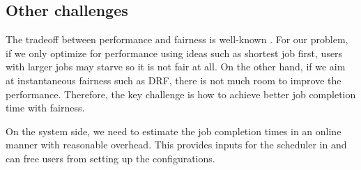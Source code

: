 




\subsection{Other challenges}




The tradeoff between performance and fairness is well-known \cite{fairness_efficency_tradeoffs,hug}.
For our problem, if we only optimize for performance using ideas such as shortest job first, users with larger jobs may starve so it is not fair at all.
On the other hand, if we aim at instantaneous fairness such as DRF, there is not much room to improve the performance.
Therefore, the key challenge is how to achieve better job completion time with fairness. 


On the system side, we need to estimate the job completion times in an online manner with reasonable overhead.
This provides inputs for the scheduler in \name and can free users from setting up the configurations. 




